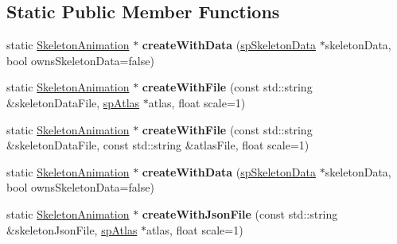 \subsection*{Static Public Member Functions}
\begin{DoxyCompactItemize}
\item 
\mbox{\label{classspine_1_1SkeletonAnimation_a534432dc942fbae28c69664f9a2cb70e}} 
static \hyperlink{classspine_1_1SkeletonAnimation}{Skeleton\+Animation} $\ast$ {\bfseries create\+With\+Data} (\hyperlink{structspSkeletonData}{sp\+Skeleton\+Data} $\ast$skeleton\+Data, bool owns\+Skeleton\+Data=false)
\item 
\mbox{\label{classspine_1_1SkeletonAnimation_a96b49584d2b066421535bca143b821af}} 
static \hyperlink{classspine_1_1SkeletonAnimation}{Skeleton\+Animation} $\ast$ {\bfseries create\+With\+File} (const std\+::string \&skeleton\+Data\+File, \hyperlink{structspAtlas}{sp\+Atlas} $\ast$atlas, float scale=1)
\item 
\mbox{\label{classspine_1_1SkeletonAnimation_abc3e3ce301b94735c22cdf36fdb8fb1b}} 
static \hyperlink{classspine_1_1SkeletonAnimation}{Skeleton\+Animation} $\ast$ {\bfseries create\+With\+File} (const std\+::string \&skeleton\+Data\+File, const std\+::string \&atlas\+File, float scale=1)
\item 
\mbox{\label{classspine_1_1SkeletonAnimation_abfa1d043789450b8ad69550457f2d0a4}} 
static \hyperlink{classspine_1_1SkeletonAnimation}{Skeleton\+Animation} $\ast$ {\bfseries create\+With\+Data} (\hyperlink{structspSkeletonData}{sp\+Skeleton\+Data} $\ast$skeleton\+Data, bool owns\+Skeleton\+Data=false)
\item 
\mbox{\label{classspine_1_1SkeletonAnimation_a5b0e3ba63da269f2e24973235402ca68}} 
static \hyperlink{classspine_1_1SkeletonAnimation}{Skeleton\+Animation} $\ast$ {\bfseries create\+With\+Json\+File} (const std\+::string \&skeleton\+Json\+File, \hyperlink{structspAtlas}{sp\+Atlas} $\ast$atlas, float scale=1)
\item 
\mbox{\label{classspine_1_1SkeletonAnimation_ad6dc5d1082fd3f40e94fcfbb0a841771}} 

\end{DoxyCompactItemize}
